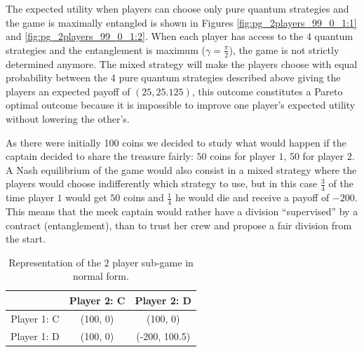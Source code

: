 The expected utility when players can choose only pure quantum strategies and the game is maximally entangled is shown in Figures \ref{fig:pg_2players_99_0_1:1} and \ref{fig:pg_2players_99_0_1:2}. When each player has access to the $4$ quantum strategies and the entanglement is maximum ($\gamma=\frac{\pi}{2}$), the game is not strictly determined anymore. The mixed strategy will make the players choose with equal probability between the 4 pure quantum strategies described above giving the players an expected payoff of $(25, 25.125)$, this outcome constitutes a Pareto optimal outcome because it is impossible to improve one player's expected utility without lowering the other's. 

As there were initially 100 coins we decided to study what would happen if the captain decided to share the treasure fairly: $50$ coins for player $1$, $50$ for player $2$. A Nash equilibrium of the game would also consist in a mixed strategy where the players would choose indifferently which strategy to use, but in this case $\frac{3}{4}$ of the time player $1$ would get $50$ coins and $\frac{1}{4}$ he would die and receive a payoff of $-200$. This means that the meek captain would rather have a division ``supervised'' by a contract (entanglement), than to trust her crew and propose a fair division from the start.

\begin{table}[h]
\begin{center}
\begin{centering}
\begin{tabular}{ccc}
\hline 
  & Player 2: C & Player 2: D\tabularnewline
\hline 
Player 1: C & (100, 0) & (100, 0)\tabularnewline
Player 1: D & (100, 0) & (-200, 100.5)\tabularnewline
\hline 
\end{tabular}

\par\end{centering}
\caption{Representation of the $2$ player sub-game in normal form.}
\label{tab:classico2jogadores_analise}
\end{center}
\end{table}

